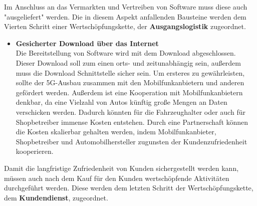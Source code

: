 Im Anschluss an das Vermarkten und Vertreiben von Software muss diese auch "ausgeliefert" werden. Die in diesem Aspekt anfallenden Bausteine werden dem Vierten Schritt einer Wertschöpfungskette, der \textbf{Ausgangslogistik} zugeordnet.
\begin{itemize}
	\item[] \hspace{-0.6cm} \textbf{Gesicherter Download über das Internet	}\\
	Die Bereitstellung von Software wird mit dem Download abgeschlossen. Dieser Download soll zum einen orts- und zeitunabhängig sein, außerdem muss die Download Schnittstelle sicher sein. Um ersteres zu gewährleisten, sollte der 5G-Ausbau zusammen mit den Mobilfunkanbietern und anderen gefördert werden. Außerdem ist eine Kooperation mit Mobilfunkanbietern denkbar, da eine Vielzahl von Autos künftig große Mengen an Daten verschicken werden. Dadurch könnten für die Fahrzeughalter oder auch für Shopbetreiber immense Kosten entstehen. Durch eine Partnerschaft können die Kosten skalierbar gehalten werden, indem Mobilfunkanbieter, Shopbetreiber und Automobilhersteller zugunsten der Kundenzufriedenheit kooperieren.
\end{itemize}
Damit die langfristige Zufriedenheit von Kunden sichergestellt werden kann, müssen auch nach dem Kauf für den Kunden wertschöpfende Aktivitäten durchgeführt werden. Diese werden dem letzten Schritt der Wertschöpfungskette, dem \textbf{Kundendienst}, zugeordnet.	
